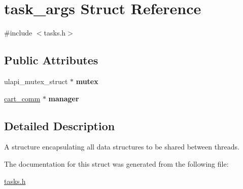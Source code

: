 \hypertarget{structtask__args}{}\section{task\+\_\+args Struct Reference}
\label{structtask__args}


{\ttfamily \#include $<$tasks.\+h$>$}

\subsection*{Public Attributes}
\begin{DoxyCompactItemize}
\item 
\mbox{\label{structtask__args_ab88b631b1a6cd5554cdfb51f5718d277}} 
ulapi\+\_\+mutex\+\_\+struct $\ast$ {\bfseries mutex}
\item 
\mbox{\label{structtask__args_a5e09a1b2b448a92ddd08ad4bb785df50}} 
\hyperlink{classcart__comm}{cart\+\_\+comm} $\ast$ {\bfseries manager}
\end{DoxyCompactItemize}


\subsection{Detailed Description}
A structure encapsulating all data structures to be shared between threads. 

The documentation for this struct was generated from the following file\+:\begin{DoxyCompactItemize}
\item 
\hyperlink{tasks_8h}{tasks.\+h}\end{DoxyCompactItemize}
